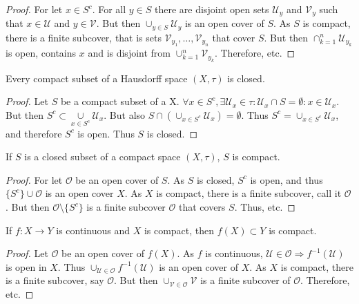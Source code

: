 \documentclass[crop=false,class=book,oneside]{standalone}
\begin{document}
            \begin{proof}
            For let $x\in S^c$. For all $y\in S$ there are disjoint open sets $\mathcal{U}_y$ and $\mathcal{V}_y$ such that $x\in \mathcal{U}$ and $y\in \mathcal{V}$. But then $\cup_{y\in S} \mathcal{U}_y$ is an open cover of $S$. As $S$ is compact, there is a finite subcover, that is sets $\mathcal{V}_{y_1},\hdots, \mathcal{V}_{y_n}$ that cover $S$. But then $\cap_{k=1}^{n} \mathcal{U}_{y_k}$ is open, contains $x$ and is disjoint from $\cup_{k=1}^{n} \mathcal{V}_{y_k}$. Therefore, etc.
            \end{proof}
            \begin{theorem}
            Every compact subset of a Hausdorff space $(X,\tau)$ is closed.
            \end{theorem}
            \begin{proof}
            Let $S$ be a compact subset of a X. $\forall x\in S^c, \exists \mathcal{U}_x\in \tau:\mathcal{U}_x\cap S = \emptyset:x\in \mathcal{U}_x$. But then $S^c \subset \underset{x\in S^c}\cup\mathcal{U}_x$. But also $S\cap (\cup_{x\in S^c}\mathcal{U}_x) = \emptyset$. Thus $S^c = \cup_{x\in S^c}\mathcal{U}_x$, and therefore $S^c$ is open. Thus $S$ is closed.
            \end{proof}
            \begin{theorem}
            If $S$ is a closed subset of a compact space $(X,\tau)$, $S$ is compact.
            \end{theorem}
            \begin{proof}
            For let $\mathcal{O}$ be an open cover of $S$. As $S$ is closed, $S^c$ is open, and thus $\{S^c\} \cup \mathcal{O}$ is an open cover $X$. As $X$ is compact, there is a finite subcover, call it $\mathscr{O}$. But then $\mathscr{O}\setminus \{S^c\}$ is a finite subcover $\mathcal{O}$ that covers $S$. Thus, etc.
            \end{proof}
            \begin{theorem}
            If $f:X\rightarrow Y$ is continuous and $X$ is compact, then $f(X)\subset Y$ is compact.
            \end{theorem}
            \begin{proof}
            Let $\mathcal{O}$ be an open cover of $f(X)$. As $f$ is continuous, $\mathcal{U}\in\mathcal{O}\Rightarrow f^{-1}(\mathcal{U})$ is open in $X$. Thus $\cup_{\mathcal{U}\in \mathcal{O}} f^{-1}(\mathcal{U})$ is an open cover of $X$. As $X$ is compact, there is a finite subcover, say $\mathscr{O}$. But then $\cup_{\mathcal{V}\in \mathscr{O}} \mathcal{V}$ is a finite subcover of $\mathcal{O}$. Therefore, etc.
            \end{proof}
\end{document}
